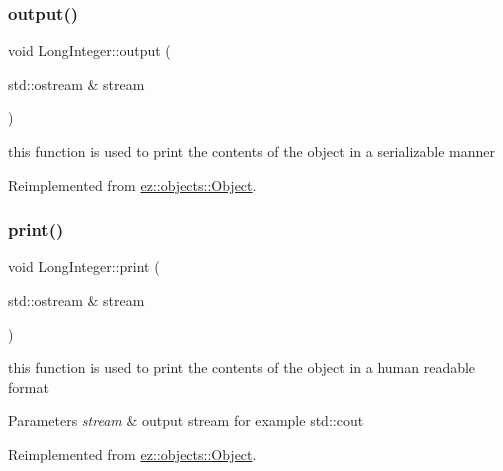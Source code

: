 \subsubsection{\texorpdfstring{output()}{output()}}
{\footnotesize\ttfamily void Long\+Integer\+::output (\begin{DoxyParamCaption}\item[{std\+::ostream \&}]{stream }\end{DoxyParamCaption})\hspace{0.3cm}{\ttfamily [virtual]}}

this function is used to print the contents of the object in a serializable manner 

Reimplemented from \hyperlink{classez_1_1objects_1_1Object_a0fdfe18e6c35d6b0d7e7a01265aded15}{ez\+::objects\+::\+Object}.

\mbox{\label{classez_1_1objects_1_1LongInteger_a61530e285ac30d7890564a6cbe6bc283}} 
\subsubsection{\texorpdfstring{print()}{print()}}
{\footnotesize\ttfamily void Long\+Integer\+::print (\begin{DoxyParamCaption}\item[{std\+::ostream \&}]{stream }\end{DoxyParamCaption})\hspace{0.3cm}{\ttfamily [virtual]}}

this function is used to print the contents of the object in a human readable format 
\begin{DoxyParams}{Parameters}
{\em stream} & output stream for example std\+::cout \\
\hline
\end{DoxyParams}


Reimplemented from \hyperlink{classez_1_1objects_1_1Object_a9e20f39a78163f67f000576149d858b3}{ez\+::objects\+::\+Object}.

\mbox{\label{classez_1_1objects_1_1LongInteger_abd2d5eb5775cb31b475d7dd20972cfc5}} 
